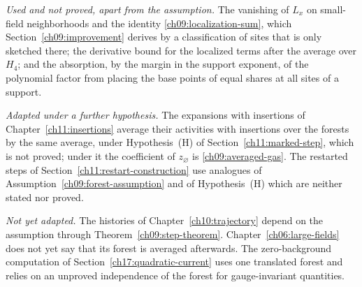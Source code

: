 \emph{Used and not proved, apart from the assumption.} The vanishing
of $L_x$ on small-field neighborhoods and the identity
\eqref{ch09:localization-sum}, which Section~\ref{ch09:improvement}
derives by a classification of sites that is only sketched there; the
derivative bound for the localized terms after the average over $H_4$;
and the absorption, by the margin in the support exponent, of the polynomial factor from placing the base points of
equal shares at all sites of a support.

\emph{Adapted under a further hypothesis.} The expansions with insertions of
Chapter~\ref{ch11:insertions} average their activities with insertions over the forests by the same average, under
Hypothesis~(H) of Section~\ref{ch11:marked-step}, which is not proved; under it the coefficient of $z_\varnothing$ is
\eqref{ch09:averaged-gas}. The restarted steps of Section~\ref{ch11:restart-construction} use analogues of
Assumption~\ref{ch09:forest-assumption} and of Hypothesis~(H) which are neither stated nor proved.

\emph{Not yet adapted.} The histories of
Chapter~\ref{ch10:trajectory} depend on the assumption through
Theorem~\ref{ch09:step-theorem}. Chapter~\ref{ch06:large-fields} does
not yet say that its forest is averaged afterwards. The zero-background
computation of Section~\ref{ch17:quadratic-current} uses one translated
forest and relies on an unproved independence of the forest for
gauge-invariant quantities.
